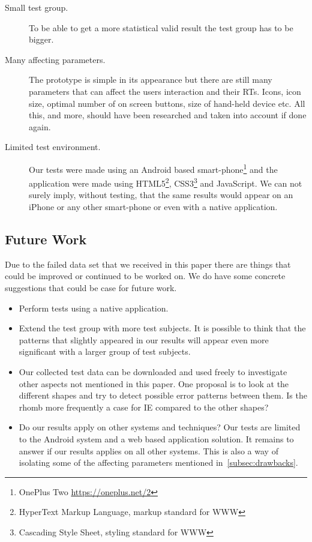 \documentclass[runningheads,a4paper]{llncs}
\begin{document}
\begin{description}
	\item[Small test group.] To be able to get a more statistical valid result the test group has to be bigger.
	\item[Many affecting parameters.] The prototype is simple in its appearance but there are still many parameters that can affect the users interaction and their RTs. Icons, icon size, optimal number of on screen buttons, size of hand-held device etc. All this, and more, should have been researched and taken into account if done again. 
	\item[Limited test environment.] Our tests were made using an Android based smart-phone\footnote{OnePlus Two \url{https://oneplus.net/2}} and the application were made using HTML5\footnote{HyperText Markup Language, markup standard for WWW}, CSS3\footnote{Cascading Style Sheet, styling standard for WWW} and JavaScript. We can not surely imply, without testing, that the same results would appear on an iPhone or any other smart-phone or even with a native application.
\end{description}

\subsection{Future Work}
Due to the failed data set that we received in this paper there are things that could be improved or continued to be worked on. 
We do have some concrete suggestions that could be case for future work. 

\begin{itemize}
	\item Perform tests using a native application.
	\item Extend the test group with more test subjects. It is possible to think that the patterns that slightly appeared in our results will appear even more significant with a larger group of test subjects.
	\item Our collected test data can be downloaded and used freely to investigate other aspects not mentioned in this paper. One proposal is to look at the different shapes and try to detect possible error patterns between them. Is the rhomb more frequently a case for IE compared to the other shapes?
	\item Do our results apply on other systems and techniques? Our tests are limited to the Android system and a web based application solution. It remains to answer if our results applies on all other systems. This is also a way of isolating some of the affecting parameters mentioned in~\ref{subsec:drawbacks}.
\end{itemize}
\end{document}
